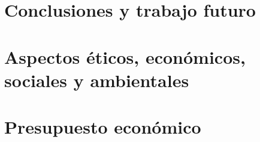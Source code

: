\documentclass[a4paper, 11pt, oneside, openright]{report}
\begin{document}
\chapter{Conclusiones y trabajo futuro}


\begin{appendices}
\chapter{\label{ap:extra}Aspectos éticos, económicos, sociales y ambientales}

\chapter{\label{ap:presupes}Presupuesto económico}

\end{appendices}
\end{document}
